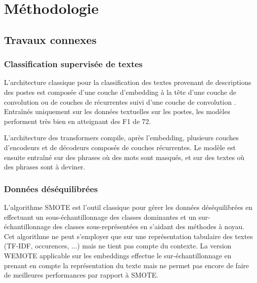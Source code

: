 \chapter{Méthodologie}

\section{Travaux connexes}
\subsection{Classification supervisée de textes}
L'architecture classique pour la classification des textes provenant de descriptions des postes est composée d'une couche d'embedding à la tête d'une couche de convolution  ou de couches de récurrentes suivi d'une couche de convolution . Entraînés uniquement sur les données textuelles sur les postes, les modèles performent très bien en atteignant des F1 de 72.

L'architecture des transformers  compile, après l'embedding, plusieurs couches d'encodeurs et de décodeurs composés de couches récurrentes. Le modèle est ensuite entraîné sur des phrases où des mots sont masqués, et sur des textes où des phrases sont à deviner.

\subsection{Données déséquilibrées}
L'algorithme SMOTE  est l'outil classique pour gérer les données déséquilibrées en effectuant un sous-échantillonnage des classes dominantes et un sur-échantillonnage des classes sous-représentées en s'aidant des méthodes à noyau. Cet algorithme ne peut s'employer que sur une représentation tabulaire des textes (TF-IDF, occurences, ...) mais ne tient pas compte du contexte. La version WEMOTE  applicable sur les embeddings effectue le sur-échantillonnage en prenant en compte la représentation du texte mais ne permet pas encore de faire de meilleures performances par rapport à SMOTE.

